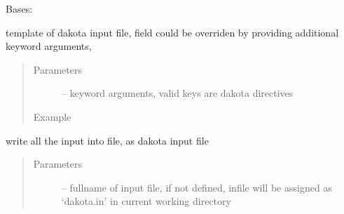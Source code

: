 \documentclass[letterpaper,10pt,english]{sphinxmanual}
\begin{document}
\begin{fulllineitems}
\label{\detokenize{src/apidocs/dakutils:genopt.dakutils.DakotaInput}}
Bases: \href{https://docs.python.org/2/library/functions.html\#object}{}

template of dakota input file, field could be overriden by
providing additional keyword arguments,
\begin{quote}\begin{description}
\item[{Parameters}] \leavevmode
{} -- keyword arguments, valid keys are dakota directives

\item[{Example}] \leavevmode
\end{description}\end{quote}

\begin{sphinxVerbatim}[commandchars=\\\{\},formatcom=\scriptsize]
  \PYG{p}{[}
\PYG{g+go}{                                  \PYGZdq{}conmin\PYGZus{}frcg\PYGZdq{},])}
\end{sphinxVerbatim}

\begin{fulllineitems}
\label{\detokenize{src/apidocs/dakutils:genopt.dakutils.DakotaInput.set_template}}
\end{fulllineitems}


\begin{fulllineitems}
\label{\detokenize{src/apidocs/dakutils:genopt.dakutils.DakotaInput.write}}
write all the input into file, as dakota input file
\begin{quote}\begin{description}
\item[{Parameters}] \leavevmode
{} -- fullname of input file, if not defined, infile will
be assigned as `dakota.in' in current working directory

\end{description}\end{quote}

\end{fulllineitems}


\end{fulllineitems}
\end{document}
